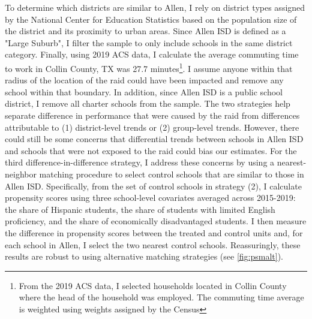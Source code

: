 \documentclass[hidelinks,twoside]{article}
\begin{document}
To determine which districts are similar to Allen, I rely on district types assigned by the National Center for Education Statistics based on the population size of the district and its proximity to urban areas. Since Allen ISD is defined as a "Large Suburb", I filter the sample to only include schools in the same district category. Finally, using 2019 ACS data, I calculate the average commuting time to work in Collin County, TX was 27.7 minutes\footnote{From the 2019 ACS data, I selected households located in Collin County where the head of the household was employed. The commuting time average is weighted using weights assigned by the Census}. I assume anyone within that radius of the location of the raid could have been impacted and remove any school within that boundary. In addition, since Allen ISD is a public school district, I remove all charter schools from the sample. The two strategies help separate difference in performance that were caused by the raid from differences attributable to (1) district-level trends or (2) group-level trends. However, there could still be some concerns that differential trends between schools in Allen ISD and schools that were not exposed to the raid could bias our estimates. For the third difference-in-difference strategy, I address these concerns by using a nearest-neighbor matching procedure to select control schools that are similar to those in Allen ISD. Specifically, from the set of control schools in strategy (2), I calculate propensity scores using three school-level covariates averaged across 2015-2019: the share of Hispanic students, the share of students with limited English proficiency, and the share of economically disadvantaged students. I then measure the difference in propensity scores between the treated and control units and, for each school in Allen, I select the two nearest control schools. Reassuringly, these results are robust to using alternative matching strategies (see \autoref{fig:psmalt}). 
\end{document}

